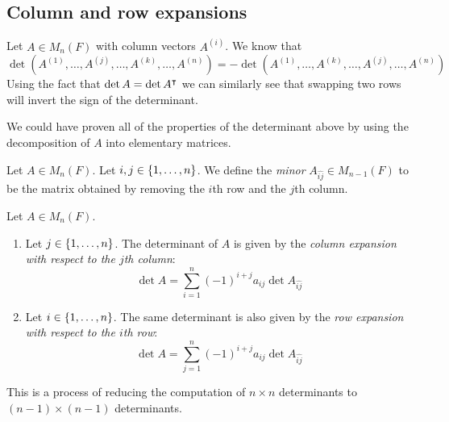 \subsection{Column and row expansions}
Let \( A \in M_n(F) \) with column vectors \( A^{(i)} \).
We know that
\[
	\det(A^{(1)}, \dots, A^{(j)}, \dots, A^{(k)}, \dots, A^{(n)}) = -\det(A^{(1)}, \dots, A^{(k)}, \dots, A^{(j)}, \dots, A^{(n)})
\]
Using the fact that \( \det A = \det A^\intercal \) we can similarly see that swapping two rows will invert the sign of the determinant.
\begin{remark}
	We could have proven all of the properties of the determinant above by using the decomposition of \( A \) into elementary matrices.
\end{remark}
\begin{definition}
	Let \( A \in M_n(F) \).
	Let \( i, j \in \qty{1, \dots, n} \).
	We define the \textit{minor} \( A_{\widehat{ij}} \in M_{n-1}(F) \) to be the matrix obtained by removing the \( i \)th row and the \( j \)th column.
\end{definition}
\begin{lemma}
	Let \( A \in M_n(F) \).
	\begin{enumerate}
		\item Let \( j \in \qty{1, \dots, n} \).
		      The determinant of \( A \) is given by the \textit{column expansion with respect to the \( j \)th column}:
		      \[
			      \det A = \sum_{i=1}^n (-1)^{i+j} a_{ij} \det A_{\widehat{ij}}
		      \]
		\item Let \( i \in \qty{1, \dots, n} \).
		      The same determinant is also given by the \textit{row expansion with respect to the \( i \)th row}:
		      \[
			      \det A = \sum_{j=1}^n (-1)^{i+j} a_{ij} \det A_{\widehat{ij}}
		      \]
	\end{enumerate}
	This is a process of reducing the computation of \( n \times n \) determinants to \( (n-1) \times (n-1) \) determinants.
\end{lemma}
